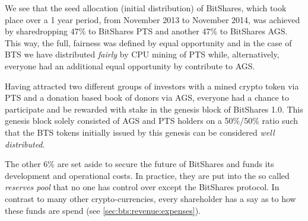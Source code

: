 We see that the seed allocation (initial distribution) of BitShares, which took
place over a 1 year period, from November 2013 to November 2014, was achieved
by sharedropping 47\% to BitShares PTS and another 47\% to BitShares AGS. This
way, the full, fairness was defined by equal opportunity and in the case of BTS
we have distributed \emph{fairly} by CPU mining of PTS while, alternatively,
everyone had an additional equal opportunity by contribute to AGS.

Having attracted two different groups of investors with a mined crypto token
via PTS and a donation based book of donors via AGS, everyone had a chance to
participate and be rewarded with stake in the genesis block of BitShares 1.0.
This genesis block solely consisted of AGS and PTS holders on a 50\%/50\% ratio
such that the BTS tokens initially issued by this genesis can be considered
\emph{well distributed}.

The other 6\% are set aside to secure the future of BitShares and funds its
development and operational costs. In practice, they are put into the so called
\emph{reserves pool} that no one has control over except the BitShares
protocol. In contrast to many other crypto-currencies, every shareholder has a
say as to how these funds are spend (see \cref{sec:bts:revenue:expenses}).
